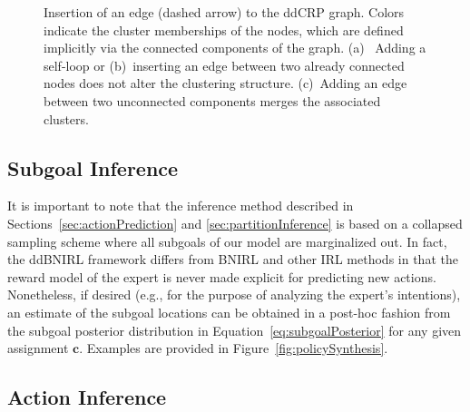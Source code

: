 \documentclass[twoside,11pt]{article}
\newcommand{\eg}{e.g.}
\begin{document}
\begin{figure}
\caption{Insertion of an edge (dashed arrow) to the ddCRP graph. Colors indicate the cluster memberships of the nodes, which are defined implicitly via the connected components of the graph. (a)~ Adding a self-loop or (b)~inserting an edge between two already connected nodes does not alter the clustering structure. (c)~Adding an edge between two unconnected components merges the associated %
	clusters.}
\label{fig:ddCRPgraph}
\end{figure}

\subsection{Subgoal Inference}%
It is important to note that the inference method described in %
Sections~\ref{sec:actionPrediction} and \ref{sec:partitionInference} 
is based on a collapsed sampling scheme where all subgoals of our model are marginalized out. %
In fact, the ddBNIRL framework %
differs from BNIRL and other IRL methods %
in that the reward model of the expert is never made explicit for predicting new actions. Nonetheless, if desired (\eg, for the purpose of %
analyzing the expert's intentions), an estimate of the %
subgoal locations can be obtained in a post-hoc fashion from the subgoal 
posterior distribution in Equation~\eqref{eq:subgoalPosterior} for any given assignment $\mathbf{c}$. Examples are provided in Figure~\ref{fig:policySynthesis}.
 
%
%
%
%
%
%
%
%
%
%
%










%
%
%
%
%
%
%
%
%
%
%
%
%
%
%
%
%
%
%
%
%
%



%
\subsection{Action Inference}
\label{sec:actionInference}
%
%
%
%
%
\end{document}
